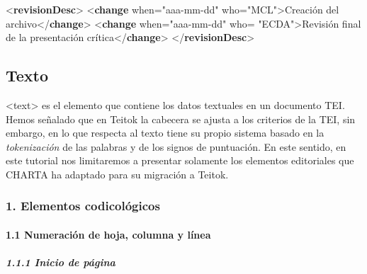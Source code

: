 \documentclass[
]{book}
\newenvironment{Shaded}{\begin{snugshade}}{\end{snugshade}}
\newcommand{\KeywordTok}[1]{\textcolor[rgb]{0.13,0.29,0.53}{\textbf{#1}}}
\newcommand{\NormalTok}[1]{#1}
\newcommand{\OtherTok}[1]{\textcolor[rgb]{0.56,0.35,0.01}{#1}}
\newcommand{\StringTok}[1]{\textcolor[rgb]{0.31,0.60,0.02}{#1}}
\begin{document}
\begin{Shaded}
\begin{Highlighting}[]
\NormalTok{\textless{}}\KeywordTok{revisionDesc}\NormalTok{\textgreater{} }
\NormalTok{  \textless{}}\KeywordTok{change}\OtherTok{ when=}\StringTok{"aaa{-}mm{-}dd"}\OtherTok{ who=}\StringTok{"MCL"}\NormalTok{\textgreater{}Creación del archivo\textless{}/}\KeywordTok{change}\NormalTok{\textgreater{}}
\NormalTok{  \textless{}}\KeywordTok{change}\OtherTok{ when=}\StringTok{"aaa{-}mm{-}dd"}\OtherTok{ who=} \StringTok{"ECDA"}\NormalTok{\textgreater{}Revisión final de la presentación crítica\textless{}/}\KeywordTok{change}\NormalTok{\textgreater{}}
\NormalTok{\textless{}/}\KeywordTok{revisionDesc}\NormalTok{\textgreater{}}
\end{Highlighting}
\end{Shaded}

\hypertarget{texto}{%
\subsection*{Texto}\label{texto}}

{ \textless text\textgreater{}} es el elemento que contiene los datos textuales en un documento TEI. Hemos señalado que en Teitok la cabecera se ajusta a los criterios de la TEI, sin embargo, en lo que respecta al texto tiene su propio sistema basado en la \emph{tokenización} de las palabras y de los signos de puntuación. En este sentido, en este tutorial nos limitaremos a presentar solamente los elementos editoriales que CHARTA ha adaptado para su migración a Teitok.

\hypertarget{elementos-codicoluxf3gicos}{%
\subsubsection*{1. Elementos codicológicos}\label{elementos-codicoluxf3gicos}}

\hypertarget{numeraciuxf3n-de-hoja-columna-y-luxednea}{%
\paragraph*{1.1 Numeración de hoja, columna y línea}\label{numeraciuxf3n-de-hoja-columna-y-luxednea}}

\hypertarget{inicio-de-puxe1gina}{%
\subparagraph*{\texorpdfstring{ 1.1.1 Inicio de página}{ 1.1.1 Inicio de página}}\label{inicio-de-puxe1gina}}
\end{document}
